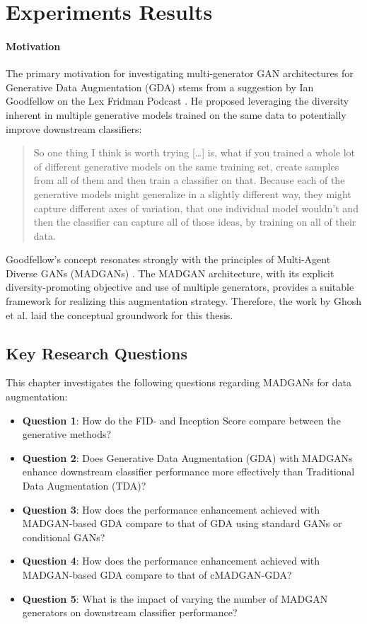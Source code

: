 \section{Experiments Results}\label{body_experiments_results}
\paragraph{Motivation}\label{exp_results_motivation}
The primary motivation for investigating multi-generator GAN architectures for Generative Data Augmentation (GDA) stems from a suggestion by Ian Goodfellow on the Lex Fridman Podcast \cite{fridman2019Goodfellow}. He proposed leveraging the diversity inherent in multiple generative models trained on the same data to potentially improve downstream classifiers:

\begin{quotation}
    \noindent So one thing I think is worth trying [\dots] is, what if you trained a whole lot of different generative models on the same training set, create samples from all of them and then train a classifier on that. Because each of the generative models might generalize in a slightly different way, they might capture different axes of variation, that one individual model wouldn't and then the classifier can capture all of those ideas, by training on all of their data.
\end{quotation}\citep[50:37]{fridman2019Goodfellow}

\noindent Goodfellow's concept resonates strongly with the principles of Multi-Agent Diverse GANs (MADGANs) \cite{ghosh2018madgan}. The MADGAN architecture, with its explicit diversity-promoting objective and use of multiple generators, provides a suitable framework for realizing this augmentation strategy. Therefore, the work by Ghosh et al. laid the conceptual groundwork for this thesis.

\subsection{Key Research Questions} \label{exp_results_research_questions}
This chapter investigates the following questions regarding MADGANs for data augmentation:
\begin{itemize}
    \item \textbf{Question 1}: How do the FID- and Inception Score compare between the generative methods?
    \item \textbf{Question 2}: Does Generative Data Augmentation (GDA) with MADGANs enhance downstream classifier performance more effectively than Traditional Data Augmentation (TDA)?
    \item \textbf{Question 3}: How does the performance enhancement achieved with MADGAN-based GDA compare to that of GDA using standard GANs or conditional GANs?
    \item \textbf{Question 4}: How does the performance enhancement achieved with MADGAN-based GDA compare to that of cMADGAN-GDA?
    \item \textbf{Question 5}: What is the impact of varying the number of MADGAN generators on downstream classifier performance?
\end{itemize}

